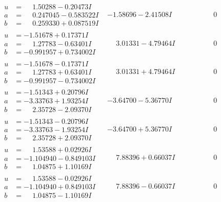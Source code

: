 \documentclass[1p]{elsarticle_modified}
\theoremstyle{definition}
\begin{document}
$$\begin{array}{c|c|c}
\begin{aligned}
u &= \phantom{-}1.50288 - 0.20473 I \\
a &= \phantom{-}0.247045 - 0.583522 I \\
b &= \phantom{-}0.259330 + 0.087519 I\end{aligned}
 & -1.58696 - 2.41508 I & \phantom{-0.000000 } 0 \\ \hline\begin{aligned}
u &= -1.51678 + 0.17371 I \\
a &= \phantom{-}1.27783 - 0.63401 I \\
b &= -0.991957 + 0.734002 I\end{aligned}
 & \phantom{-}3.01331 - 4.79464 I & \phantom{-0.000000 } 0 \\ \hline\begin{aligned}
u &= -1.51678 - 0.17371 I \\
a &= \phantom{-}1.27783 + 0.63401 I \\
b &= -0.991957 - 0.734002 I\end{aligned}
 & \phantom{-}3.01331 + 4.79464 I & \phantom{-0.000000 } 0 \\ \hline\begin{aligned}
u &= -1.51343 + 0.20796 I \\
a &= -3.33763 + 1.93254 I \\
b &= \phantom{-}2.35728 - 2.09370 I\end{aligned}
 & -3.64700 - 5.36770 I & \phantom{-0.000000 } 0 \\ \hline\begin{aligned}
u &= -1.51343 - 0.20796 I \\
a &= -3.33763 - 1.93254 I \\
b &= \phantom{-}2.35728 + 2.09370 I\end{aligned}
 & -3.64700 + 5.36770 I & \phantom{-0.000000 } 0 \\ \hline\begin{aligned}
u &= \phantom{-}1.53588 + 0.02926 I \\
a &= -1.104940 - 0.849103 I \\
b &= \phantom{-}1.04875 + 1.10169 I\end{aligned}
 & \phantom{-}7.88396 + 0.66037 I & \phantom{-0.000000 } 0 \\ \hline\begin{aligned}
u &= \phantom{-}1.53588 - 0.02926 I \\
a &= -1.104940 + 0.849103 I \\
b &= \phantom{-}1.04875 - 1.10169 I\end{aligned}
 & \phantom{-}7.88396 - 0.66037 I & \phantom{-0.000000 } 0 \\ \hline\begin{aligned}

\end{aligned}
\end{array}$$
\end{document}
